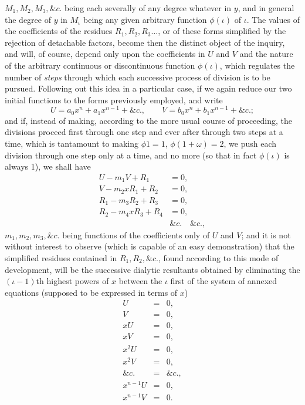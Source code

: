 \documentclass[11pt]{article}
\newcommand{\sourcepage}[1]{\marginpar{\scriptsize p.~#1}}
\begin{document}
\sourcepage{452}
$M_1,M_2,M_3,\&c.$ being each severally of any degree whatever in $y$, and in general the degree of $y$ in $M_\iota$ being any given arbitrary function $\phi(\iota)$ of $\iota$. The values of the coefficients of the residues $R_1,R_2,R_3\ldots$, or of these forms simplified by the rejection of detachable factors, become then the distinct object of the inquiry, and will, of course, depend only upon the coefficients in $U$ and $V$ and the nature of the arbitrary continuous or discontinuous function $\phi(\iota)$, which regulates the number of \emph{steps} through which each successive process of division is to be pursued. Following out this idea in a particular case, if we again reduce our two initial functions to the forms previously employed, and write
\[
U=a_0x^n+a_1x^{n-1}+\&c.,
\qquad
V=b_0x^n+b_1x^{n-1}+\&c.;
\]
and if, instead of making, according to the more usual course of proceeding, the divisions proceed first through one step and ever after through two steps at a time, which is tantamount to making $\phi1=1$, $\phi(1+\omega)=2$, we push each division through one step only at a time, and no more (so that in fact $\phi(\iota)$ is always 1), we shall have
\[
\begin{aligned}
U-m_1V+R_1&=0,\\
V-m_2xR_1+R_2&=0,\\
R_1-m_3R_2+R_3&=0,\\
R_2-m_4xR_3+R_4&=0,\\
&\&c.\quad\&c.,
\end{aligned}
\]
$m_1,m_2,m_3,\&c.$ being functions of the coefficients only of $U$ and $V$; and it is not without interest to observe (which is capable of an easy demonstration) that the simplified residues contained in $R_1,R_2,\&c.$, found according to this mode of development, will be the successive dialytic resultants obtained by eliminating the $(\iota-1)$th highest powers of $x$ between the $\iota$ first of the system of annexed equations (supposed to be expressed in terms of $x$)
\[
\begin{array}{rcl}
U&=&0,\\
V&=&0,\\
xU&=&0,\\
xV&=&0,\\
x^2U&=&0,\\
x^2V&=&0,\\
\&c.&=&\&c.,\\
x^{n-1}U&=&0,\\
x^{n-1}V&=&0.
\end{array}
\]
\end{document}

